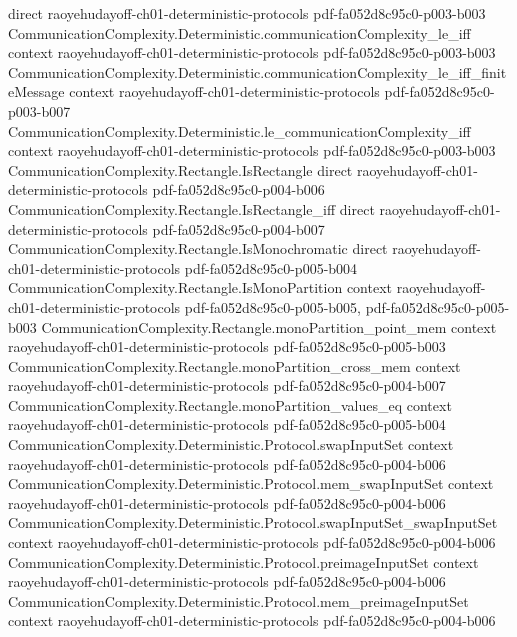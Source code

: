 \begin{theorem}
  {direct}
  {raoyehudayoff-ch01-deterministic-protocols}
  {pdf-fa052d8c95c0-p003-b003}
\proofstep
  {CommunicationComplexity.Deterministic.communicationComplexity_le_iff}
  {context}
  {raoyehudayoff-ch01-deterministic-protocols}
  {pdf-fa052d8c95c0-p003-b003}
\proofstep
  {CommunicationComplexity.Deterministic.communicationComplexity_le_iff_finiteMessage}
  {context}
  {raoyehudayoff-ch01-deterministic-protocols}
  {pdf-fa052d8c95c0-p003-b007}
\proofstep
  {CommunicationComplexity.Deterministic.le_communicationComplexity_iff}
  {context}
  {raoyehudayoff-ch01-deterministic-protocols}
  {pdf-fa052d8c95c0-p003-b003}
\proofstep
  {CommunicationComplexity.Rectangle.IsRectangle}
  {direct}
  {raoyehudayoff-ch01-deterministic-protocols}
  {pdf-fa052d8c95c0-p004-b006}
\proofstep
  {CommunicationComplexity.Rectangle.IsRectangle_iff}
  {direct}
  {raoyehudayoff-ch01-deterministic-protocols}
  {pdf-fa052d8c95c0-p004-b007}
\proofstep
  {CommunicationComplexity.Rectangle.IsMonochromatic}
  {direct}
  {raoyehudayoff-ch01-deterministic-protocols}
  {pdf-fa052d8c95c0-p005-b004}
\proofstep
  {CommunicationComplexity.Rectangle.IsMonoPartition}
  {context}
  {raoyehudayoff-ch01-deterministic-protocols}
  {pdf-fa052d8c95c0-p005-b005,
    pdf-fa052d8c95c0-p005-b003}
\proofstep
  {CommunicationComplexity.Rectangle.monoPartition_point_mem}
  {context}
  {raoyehudayoff-ch01-deterministic-protocols}
  {pdf-fa052d8c95c0-p005-b003}
\proofstep
  {CommunicationComplexity.Rectangle.monoPartition_cross_mem}
  {context}
  {raoyehudayoff-ch01-deterministic-protocols}
  {pdf-fa052d8c95c0-p004-b007}
\proofstep
  {CommunicationComplexity.Rectangle.monoPartition_values_eq}
  {context}
  {raoyehudayoff-ch01-deterministic-protocols}
  {pdf-fa052d8c95c0-p005-b004}
\proofstep
  {CommunicationComplexity.Deterministic.Protocol.swapInputSet}
  {context}
  {raoyehudayoff-ch01-deterministic-protocols}
  {pdf-fa052d8c95c0-p004-b006}
\proofstep
  {CommunicationComplexity.Deterministic.Protocol.mem_swapInputSet}
  {context}
  {raoyehudayoff-ch01-deterministic-protocols}
  {pdf-fa052d8c95c0-p004-b006}
\proofstep
  {CommunicationComplexity.Deterministic.Protocol.swapInputSet_swapInputSet}
  {context}
  {raoyehudayoff-ch01-deterministic-protocols}
  {pdf-fa052d8c95c0-p004-b006}
\proofstep
  {CommunicationComplexity.Deterministic.Protocol.preimageInputSet}
  {context}
  {raoyehudayoff-ch01-deterministic-protocols}
  {pdf-fa052d8c95c0-p004-b006}
\proofstep
  {CommunicationComplexity.Deterministic.Protocol.mem_preimageInputSet}
  {context}
  {raoyehudayoff-ch01-deterministic-protocols}
  {pdf-fa052d8c95c0-p004-b006}

\end{theorem}
